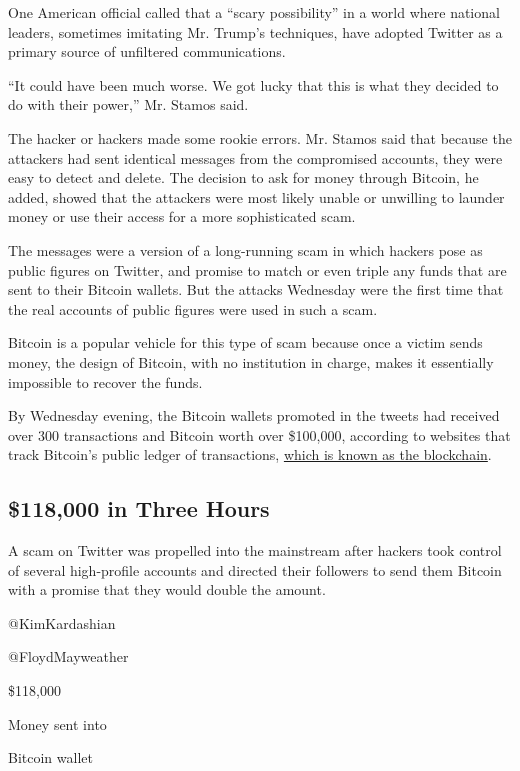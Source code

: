 One American official called that a ``scary possibility'' in a world
where national leaders, sometimes imitating Mr. Trump's techniques, have
adopted Twitter as a primary source of unfiltered communications.

``It could have been much worse. We got lucky that this is what they
decided to do with their power,'' Mr. Stamos said.

The hacker or hackers made some rookie errors. Mr. Stamos said that
because the attackers had sent identical messages from the compromised
accounts, they were easy to detect and delete. The decision to ask for
money through Bitcoin, he added, showed that the attackers were most
likely unable or unwilling to launder money or use their access for a
more sophisticated scam.

The messages were a version of a long-running scam in which hackers pose
as public figures on Twitter, and promise to match or even triple any
funds that are sent to their Bitcoin wallets. But the attacks Wednesday
were the first time that the real accounts of public figures were used
in such a scam.

Bitcoin is a popular vehicle for this type of scam because once a victim
sends money, the design of Bitcoin, with no institution in charge, makes
it essentially impossible to recover the funds.

By Wednesday evening, the Bitcoin wallets promoted in the tweets had
received over 300 transactions and Bitcoin worth over \$100,000,
according to websites that track Bitcoin's public ledger of
transactions,
\href{https://www.nytimes.com/2018/06/27/business/dealbook/blockchains-guide-information.html}{which
is known as the blockchain}.

\hypertarget{118000-in-three-hours}{%
\subsection{\$118,000 in Three Hours}\label{118000-in-three-hours}}

A scam on Twitter was propelled into the mainstream after hackers took
control of several high-profile accounts and directed their followers to
send them Bitcoin with a promise that they would double the amount.

@KimKardashian

@FloydMayweather

\$118,000

Money sent into

Bitcoin wallet

